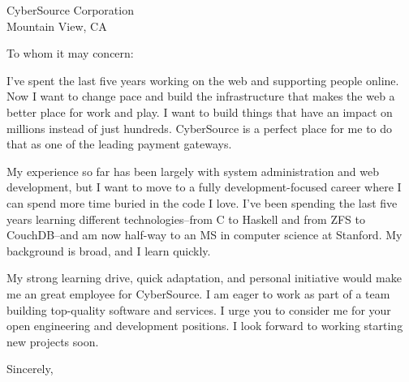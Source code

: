 \documentclass{letter}[11pt]
\begin{document}
\begin{letter}{CyberSource Corporation\\
Mountain View, CA
}

\opening{To whom it may concern:}

I've spent the last five years working on the web and supporting people online.  Now I want to change pace and build the infrastructure that makes the web a better place for work and play.  I want to build things that have an impact on millions instead of just hundreds.  CyberSource is a perfect place for me to do that as one of the leading payment gateways.

My experience so far has been largely with system administration and web development, but I want to move to a fully development-focused career where I can spend more time buried in the code I love.  I've been spending the last five years learning different technologies--from C to Haskell and from ZFS to CouchDB--and am now half-way to an MS in computer science at Stanford.  My background is broad, and I learn quickly.

My strong learning drive, quick adaptation, and personal initiative would make me an great employee for CyberSource.  I am eager to work as part of a team building top-quality software and services.  I urge you to consider me for your open engineering and development positions.  I look forward to working starting new projects soon.


\closing{Sincerely,}
\end{letter}
\end{document}
